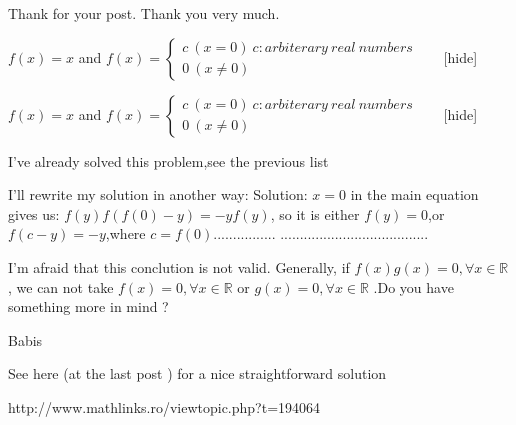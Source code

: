 \begin{solution}
	Thank for your post. Thank you very much.
\end{solution}



\begin{solution}$ f(x)=x$ and $ f(x)=\left\{
\begin{array}{ll}
c\ (x=0)\ c: arbiterary\ real\ numbers  &\quad  \\
0\ (x\neq 0) &\quad
\end{array}
\right.$[\/hide]
\end{solution}



\begin{solution}
	\begin{tcolorbox}[hide="Answer"]$ f(x) = x$ and $ f(x) = \left\{ \begin{array}{ll} c\ (x = 0)\ c: arbiterary\ real\ numbers & \quad \\
0\ (x\neq 0) & \quad \end{array} \right.$[\/hide]\end{tcolorbox}
I've already solved this problem,see the previous list 
\end{solution}



\begin{solution}
	\begin{tcolorbox}I'll rewrite my solution in another way:
Solution:
$ x = 0$ in the main equation gives us:
$ f(y)f(f(0) - y) = - yf(y)$,
so it is either $ f(y) = 0$,or $ f(c - y) = - y$,where $ c = f(0)$................
......................................
\end{tcolorbox}

 I'm afraid that this conclution is not valid. Generally, if $ f(x)g(x) = 0 ,   \forall x \in \mathbb R$ , we can not take $ f(x) = 0 , \forall x \in \mathbb R$ or $ g(x) = 0 , \forall x \in \mathbb R$ .Do you have something more in mind ?

 Babis
\end{solution}



\begin{solution}
	See here (at the last post ) for a nice straightforward solution 

http://www.mathlinks.ro/viewtopic.php?t=194064
\end{solution}



